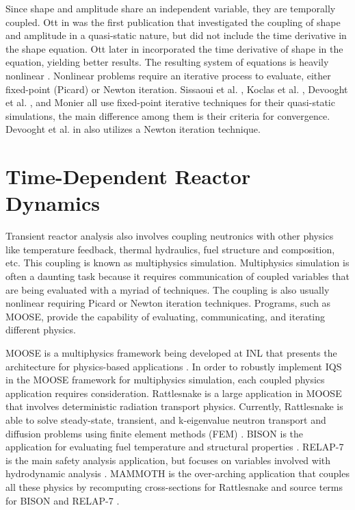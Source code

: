 Since shape and amplitude share an independent variable, they are temporally coupled. Ott in \cite{Ott_1966} was the first publication that investigated the coupling of shape and amplitude in a quasi-static nature, but did not include the time derivative in the shape equation. Ott later in \cite{Ott_1969} incorporated the time derivative of shape in the equation, yielding better results.  The resulting system of equations is heavily nonlinear \cite{Dulla2008}. Nonlinear problems require an iterative process to evaluate, either fixed-point (Picard) or Newton iteration. Sissaoui et al. \cite{Sissaoui_1995}, Koclas et al. \cite{Koclas_1996}, Devooght et al. \cite{Devooght_1984}, and Monier \cite{Monier_diss} all use fixed-point iterative techniques for their quasi-static simulations, the main difference among them is their criteria for convergence.  Devooght et al. in \cite{Devooght_1984} also utilizes a Newton iteration technique.

\section{Time-Dependent Reactor Dynamics}

Transient reactor analysis also involves coupling neutronics with other physics like temperature feedback, thermal hydraulics, fuel structure and composition, etc. This coupling is known as multiphysics simulation. Multiphysics simulation is often a daunting task because it requires communication of coupled variables that are being evaluated with a myriad of techniques. The coupling is also usually nonlinear requiring Picard or Newton iteration techniques. Programs, such as MOOSE, provide the capability of evaluating, communicating, and iterating different physics. 

MOOSE is a multiphysics framework being developed at INL that presents the architecture for physics-based applications \cite{moose}.  In order to robustly implement IQS in the MOOSE framework for multiphysics simulation, each coupled physics application requires consideration. Rattlesnake is a large application in MOOSE that involves deterministic radiation transport physics.  Currently, Rattlesnake is able to solve steady-state, transient, and k-eigenvalue neutron transport and diffusion problems using finite element methods (FEM) \cite{wang2013}. BISON is the application for evaluating fuel temperature and structural properties \cite{bison}.  RELAP-7 is the main safety analysis application, but focuses on variables involved with hydrodynamic analysis \cite{relap7}.  MAMMOTH is the over-arching application that couples all these physics by recomputing cross-sections for Rattlesnake and source terms for BISON and RELAP-7 \cite{mammoth}.

